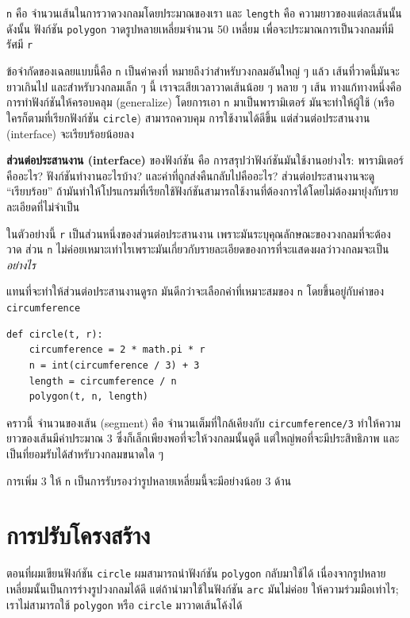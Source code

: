 {\tt n} คือ จำนวนเส้นในการวาดวงกลมโดยประมาณของเรา และ {\tt length} คือ ความยาวของแต่ละเส้นนั้น  
ดังนั้น ฟังก์ชัน {\tt polygon} วาดรูปหลายเหลี่ยมจำนวน 50 เหลี่ยม เพื่อจะประมาณการเป็นวงกลมที่มีรัศมี {\tt r}

ข้อจำกัดของเฉลยแบบนี้คือ {\tt n} เป็นค่าคงที่ หมายถึงว่าสำหรับวงกลมอันใหญ่ ๆ แล้ว เส้นที่วาดนี้มันจะยาวเกินไป
และสำหรับวงกลมเล็ก ๆ นี้ เราจะเสียเวลาวาดเส้นน้อย ๆ หลาย ๆ เส้น ทางแก้ทางหนึ่งคือการทำฟังก์ชันให้ครอบคลุม (generalize)
โดยการเอา {\tt n} มาเป็นพารามิเตอร์ มันจะทำให้ผู้ใช้ (หรือใครก็ตามที่เรียกฟังก์ชัน {\tt circle}) สามารถควบคุม
การใช้งานได้ดีขึ้น แต่ส่วนต่อประสานงาน (interface) จะเรียบร้อยน้อยลง

{\bf ส่วนต่อประสานงาน (interface)} ของฟังก์ชัน คือ การสรุปว่าฟังก์ชันมันใช้งานอย่างไร:
พารามิเตอร์คืออะไร? ฟังก์ชันทำงานอะไรบ้าง? และค่าที่ถูกส่งคืนกลับไปคืออะไร? ส่วนต่อประสานงานจะดู ``เรียบร้อย''
ถ้ามันทำให้โปรแกรมที่เรียกใช้ฟังก์ชันสามารถใช้งานที่ต้องการได้โดยไม่ต้องมายุ่งกับรายละเอียดที่ไม่จำเป็น

ในตัวอย่างนี้ {\tt r} เป็นส่วนหนึ่งของส่วนต่อประสานงาน เพราะมันระบุคุณลักษณะของวงกลมที่จะต้องวาด 
ส่วน {\tt n} ไม่ค่อยเหมาะเท่าไรเพราะมันเกี่ยวกับรายละเอียดของการที่จะแสดงผลว่าวงกลมจะเป็น {\em อย่างไร} 

แทนที่จะทำให้ส่วนต่อประสานงานดูรก มันดีกว่าจะเลือกค่าที่เหมาะสมของ {\tt n} โดยขึ้นอยู่กับค่าของ {\tt circumference}

\begin{verbatim}
def circle(t, r):
    circumference = 2 * math.pi * r
    n = int(circumference / 3) + 3
    length = circumference / n
    polygon(t, n, length)
\end{verbatim}
%
คราวนี้ จำนวนของเส้น (segment) คือ จำนวนเต็มที่ใกล้เคียงกับ {\tt circumference/3} ทำให้ความยาวของเส้นมีค่าประมาณ 3 
ซึ่งก็เล็กเพียงพอที่จะให้วงกลมนั้นดูดี แต่ใหญ่พอที่จะมีประสิทธิภาพ และเป็นที่ยอมรับได้สำหรับวงกลมขนาดใด ๆ

การเพิ่ม 3 ให้ {\tt n} เป็นการรับรองว่ารูปหลายเหลี่ยมนี้จะมีอย่างน้อย 3 ด้าน

\section{การปรับโครงสร้าง} %
\label{refactoring}

ตอนที่ผมเขียนฟังก์ชัน {\tt circle} ผมสามารถนำฟังก์ชัน {\tt polygon} กลับมาใช้ได้
เนื่องจากรูปหลายเหลี่ยมนั้นเป็นการร่างรูปวงกลมได้ดี  แต่ถ้านำมาใช้ในฟังก์ชัน {\tt arc} มันไม่ค่อย
ให้ความร่วมมือเท่าไร; เราไม่สามารถใช้ {\tt polygon} หรือ {\tt circle} มาวาดเส้นโค้งได้  



